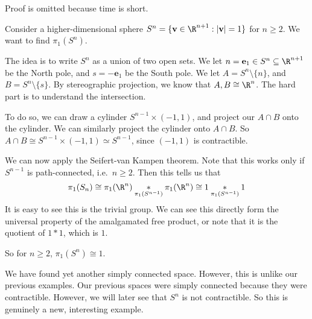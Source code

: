\documentclass[a4paper]{article}
\begin{document}
Proof is omitted because time is short. %

\begin{eg}
  Consider a higher-dimensional sphere $S^n = \{\mathbf{v} \in \R^{n + 1}: |\mathbf{v}| = 1\}$ for $n \geq 2$. We want to find $\pi_1(S^n)$.

  The idea is to write $S^n$ as a union of two open sets. We let $n = \mathbf{e}_1 \in S^n \subseteq \R^{n + 1}$ be the North pole, and $s = -\mathbf{e}_1$ be the South pole. We let $A = S^n \setminus \{n\}$, and $B = S^n \setminus\{s\}$. By stereographic projection, we know that $A, B \cong \R^n$. The hard part is to understand the intersection.

  To do so, we can draw a cylinder $S^{n - 1} \times (-1, 1)$, and project our $A\cap B$ onto the cylinder. We can similarly project the cylinder onto $A\cap B$. So $A\cap B\cong S^{n - 1} \times (-1, 1) \simeq S^{n - 1}$, since $(-1, 1)$ is contractible.
  \begin{center}
  \end{center}
  We can now apply the Seifert-van Kampen theorem. Note that this works only if $S^{n - 1}$ is path-connected, i.e.\ $n \geq 2$. Then this tells us that
  \[
    \pi_1(S_n) \cong \pi_1(\R^n) \underset{\pi_1(S^{n - 1})}{*} \pi_1(\R^n) \cong 1 \underset{\pi_1(S^{n - 1})}{*} 1
  \]
  It is easy to see this is the trivial group. We can see this directly form the universal property of the amalgamated free product, or note that it is the quotient of $1 * 1$, which is $1$.

  So for $n \geq 2$, $\pi_1(S^n) \cong 1$.
\end{eg}
We have found yet another simply connected space. However, this is unlike our previous examples. Our previous spaces were simply connected because they were contractible. However, we will later see that $S^n$ is not contractible. So this is genuinely a new, interesting example.
\end{document}
